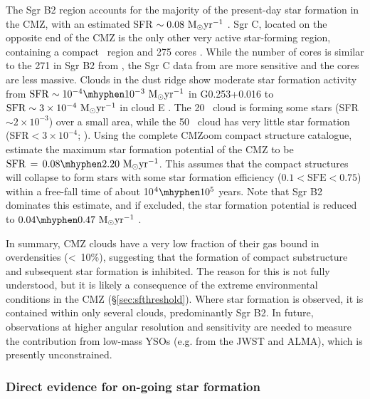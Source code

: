 The Sgr B2 region accounts for the majority of the present-day star formation in the CMZ, with an estimated SFR $\sim 0.08~\mbox{M$_\odot$}\mbox{${\rm yr^{-1}}$}$ \citep{Schmiedeke2016,Ginsburg2018a,Barnes2017}. 
Sgr C, located on the opposite end of the CMZ is the only other very active star-forming region, containing a compact \hii\ region and 275 cores \citep{Kendrew2013,Lu2019b,Lu2020}. While the number of cores is similar to the 271 in Sgr B2 from \citet{Ginsburg2018b}, the Sgr C data from \citet{Lu2020} are more sensitive and the cores are less massive. 
Clouds in the dust ridge show moderate star formation activity from $\mathrm{SFR}\sim10^{-4}\mhyphen10^{-3}~\msun \peryr$ in G0.253+0.016 \citep{Rathborne2014a,Walker2021} to $\mathrm{SFR}\sim3\times10^{-4}~\mbox{M$_\odot$}\mbox{${\rm yr^{-1}}$}$ in cloud E \citep{Lu2019b}.
The 20 \kms\ cloud is forming some stars (SFR $\sim2\times10^{-3}$) over a small area, while the 50 \kms\ cloud has very little star formation (SFR$<3\times10^{-4}$; \citealp{Lu2019b,Uehara2019,Miyawaki2021}).
Using the complete CMZoom compact structure catalogue, \citet{Hatchfield2020} estimate the maximum star formation potential of the CMZ to be $\mathrm{SFR}\,=\,0.08\mhyphen2.20~\msun\peryr$. This assumes that the compact structures will collapse to form stars with some star formation efficiency ($0.1 < \mathrm{SFE} < 0.75$) within a free-fall time of about 10$^4\mhyphen10^5$ years. Note that Sgr B2 dominates this estimate, and if excluded, the star formation potential is reduced to $0.04\mhyphen0.47~\msun\peryr$ \citep{Hatchfield2020}.

In summary, CMZ clouds have a very low fraction of their gas bound in overdensities (\textless \ 10\%), suggesting that the formation of compact substructure and subsequent star formation is inhibited. The reason for this is not fully understood, but it is likely a consequence of the extreme environmental conditions in the CMZ (\S\ref{sec:sfthreshold}). Where star formation is observed, it is contained within only several clouds, predominantly Sgr B2. In future, observations at higher angular resolution and sensitivity are needed to measure the contribution from low-mass YSOs (e.g. from the JWST and ALMA), which is presently unconstrained.

\subsubsection{Direct evidence for on-going star formation} 
\label{sec:ongoingstarformation}



